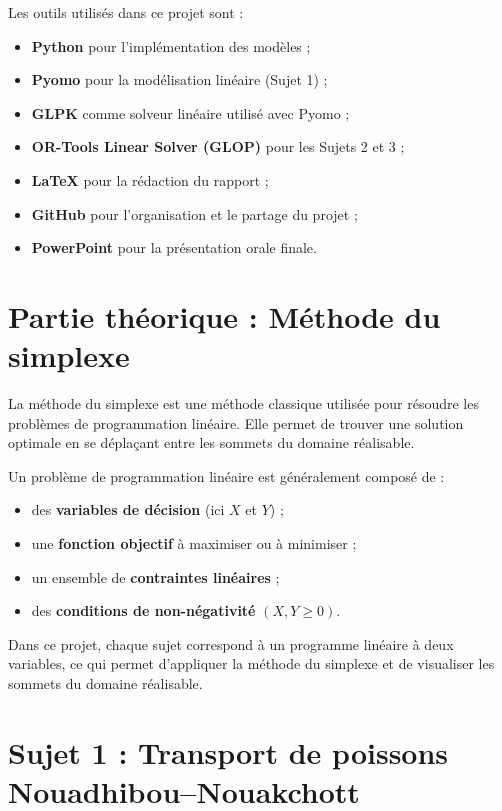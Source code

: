 \documentclass[12pt,a4paper]{article}
\newcommand{\Geq}{\geqslant}
\begin{document}
Les outils utilisés dans ce projet sont :
\begin{itemize}
    \item \textbf{Python} pour l'implémentation des modèles ;
    \item \textbf{Pyomo} pour la modélisation linéaire (Sujet 1) ;
    \item \textbf{GLPK} comme solveur linéaire utilisé avec Pyomo ;
    \item \textbf{OR-Tools Linear Solver (GLOP)} pour les Sujets 2 et 3 ;
    \item \textbf{\LaTeX} pour la rédaction du rapport ;
    \item \textbf{GitHub} pour l'organisation et le partage du projet ;
    \item \textbf{PowerPoint} pour la présentation orale finale.
\end{itemize}

\section{Partie théorique : Méthode du simplexe}

La méthode du simplexe est une méthode classique utilisée pour résoudre les problèmes de programmation linéaire. Elle permet de trouver une solution optimale en se déplaçant entre les sommets du domaine réalisable.

Un problème de programmation linéaire est généralement composé de :
\begin{itemize}
    \item des \textbf{variables de décision} (ici \(X\) et \(Y\)) ;
    \item une \textbf{fonction objectif} à maximiser ou à minimiser ;
    \item un ensemble de \textbf{contraintes linéaires} ;
    \item des \textbf{conditions de non-négativité} \((X, Y \Geq 0)\).
\end{itemize}

Dans ce projet, chaque sujet correspond à un programme linéaire à deux variables, ce qui permet d'appliquer la méthode du simplexe et de visualiser les sommets du domaine réalisable.

\section{Sujet 1 : Transport de poissons Nouadhibou--Nouakchott}
\end{document}
